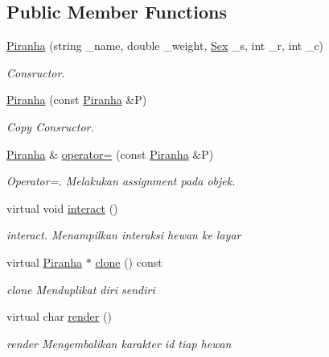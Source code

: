 \subsection*{Public Member Functions}
\begin{DoxyCompactItemize}
\item 
\hyperlink{classPiranha_a943037a0b0d5f151052d39abace8af3c}{Piranha} (string \+\_\+name, double \+\_\+weight, \hyperlink{sex_8h_a2633cb393c68bb2ee8080db58fb7ba93}{Sex} \+\_\+s, int \+\_\+r, int \+\_\+c)
\begin{DoxyCompactList}\small\item\em Consructor. \end{DoxyCompactList}\item 
\hyperlink{classPiranha_a22d9ff01ea904789fbd3221f2789117b}{Piranha} (const \hyperlink{classPiranha}{Piranha} \&P)
\begin{DoxyCompactList}\small\item\em Copy Consructor. \end{DoxyCompactList}\item 
\hyperlink{classPiranha}{Piranha} \& \hyperlink{classPiranha_aee78b0eb2bea763ef07a75365463376e}{operator=} (const \hyperlink{classPiranha}{Piranha} \&P)
\begin{DoxyCompactList}\small\item\em Operator=. Melakukan assignment pada objek. \end{DoxyCompactList}\item 
virtual void \hyperlink{classPiranha_a115e6e7d67f93c005eaec8ba77d209a7}{interact} ()
\begin{DoxyCompactList}\small\item\em interact. Menampilkan interaksi hewan ke layar \end{DoxyCompactList}\item 
virtual \hyperlink{classPiranha}{Piranha} $\ast$ \hyperlink{classPiranha_a7f844252f5836441f77dc90e12822813}{clone} () const 
\begin{DoxyCompactList}\small\item\em clone Menduplikat diri sendiri \end{DoxyCompactList}\item 
virtual char \hyperlink{classPiranha_aa0cd9c03f7ce955dfa234eba4b3d7d7c}{render} ()
\begin{DoxyCompactList}\small\item\em render Mengembalikan karakter id tiap hewan \end{DoxyCompactList}\item 

\end{DoxyCompactItemize}
